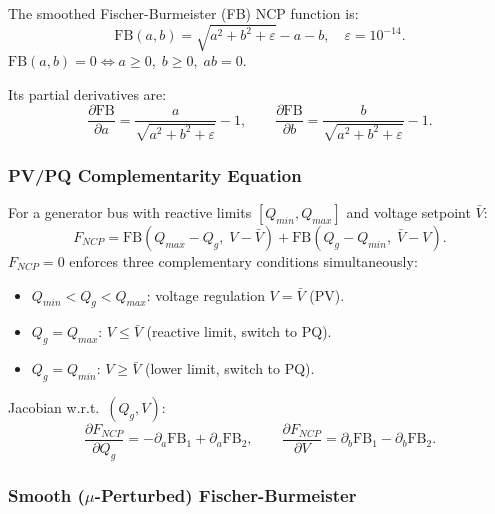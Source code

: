The smoothed Fischer-Burmeister (FB) NCP function is:
\begin{equation}
  \mathrm{FB}(a, b) = \sqrt{a^2 + b^2 + \varepsilon} - a - b, \quad \varepsilon = 10^{-14}.
\end{equation}
$\mathrm{FB}(a, b) = 0 \iff a \geq 0,\; b \geq 0,\; ab = 0$.

Its partial derivatives are:
\begin{equation}
  \frac{\partial \mathrm{FB}}{\partial a} = \frac{a}{\sqrt{a^2+b^2+\varepsilon}} - 1, \qquad
  \frac{\partial \mathrm{FB}}{\partial b} = \frac{b}{\sqrt{a^2+b^2+\varepsilon}} - 1.
\end{equation}

\subsubsection{PV/PQ Complementarity Equation}

For a generator bus with reactive limits $[Q_{min}, Q_{max}]$ and
voltage setpoint $\bar{V}$:
\begin{equation}
  F_{NCP} = \mathrm{FB}(Q_{max} - Q_g,\; V - \bar{V}) +
             \mathrm{FB}(Q_g - Q_{min},\; \bar{V} - V).
\end{equation}
$F_{NCP}=0$ enforces three complementary conditions simultaneously:
\begin{itemize}
  \item $Q_{min} < Q_g < Q_{max}$: voltage regulation $V = \bar{V}$ (PV).
  \item $Q_g = Q_{max}$: $V \leq \bar{V}$ (reactive limit, switch to PQ).
  \item $Q_g = Q_{min}$: $V \geq \bar{V}$ (lower limit, switch to PQ).
\end{itemize}

Jacobian w.r.t.\ $(Q_g, V)$:
\begin{equation}
  \frac{\partial F_{NCP}}{\partial Q_g} = -\partial_a\mathrm{FB}_1 + \partial_a\mathrm{FB}_2, \qquad
  \frac{\partial F_{NCP}}{\partial V} = \partial_b\mathrm{FB}_1 - \partial_b\mathrm{FB}_2.
\end{equation}

\subsubsection{Smooth (\texorpdfstring{$\mu$}{mu}-Perturbed) Fischer-Burmeister}

